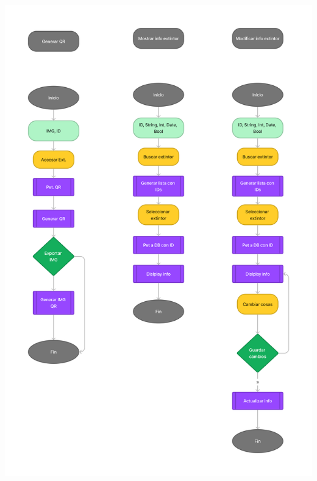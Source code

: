 \documentclass[a4paper,twoside,10pt]{report}
\begin{document}
\includegraphics[width=1.0\textwidth]{GamingDiagrama1.png}
\end{document}
